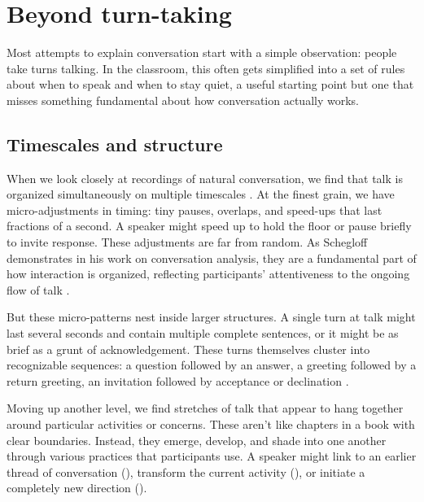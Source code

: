 \section{Beyond turn-taking} \label{sec:beyond-turns}

Most attempts to explain conversation start with a simple observation: people take turns talking. In the classroom, this often gets simplified into a set of rules about when to speak and when to stay quiet, a useful starting point but one that misses something fundamental about how conversation actually works.

\subsection{Timescales and structure} \label{subsec:timescales}

When we look closely at recordings of natural conversation, we find that talk is organized simultaneously on multiple timescales \citep{Schegloff1977,Fauviaux2024}. At the finest grain, we have micro-adjustments in timing: tiny pauses, overlaps, and speed-ups that last fractions of a second. A speaker might speed up to hold the floor or pause briefly to invite response. These adjustments are far from random. As Schegloff demonstrates in his work on conversation analysis, they are a fundamental part of how interaction is organized, reflecting participants' attentiveness to the ongoing flow of talk \citep{Schegloff1982}.

But these micro-patterns nest inside larger structures. A single turn at talk might last several seconds and contain multiple complete sentences, or it might be as brief as a grunt of acknowledgement. These turns themselves cluster into recognizable sequences: a question followed by an answer, a greeting followed by a return greeting, an invitation followed by acceptance or declination \citep{Sacks1973}.

Moving up another level, we find stretches of talk that appear to hang together around particular activities or concerns. These aren't like chapters in a book with clear boundaries. Instead, they emerge, develop, and shade into one another through various practices that participants use. A speaker might link to an earlier thread of conversation (), transform the current activity (), or initiate a completely new direction ().

